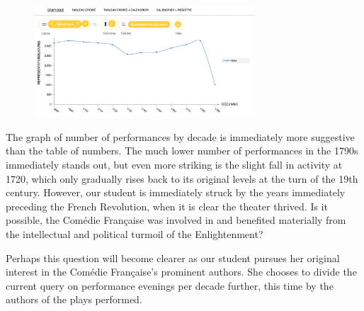 \documentclass[	DIV=calc,%
							paper=a4,%
							fontsize=11pt,%
							twocolumn]{scrartcl}	 					%
\begin{document}
\begin{figure}
  \centering
	\includegraphics[width=3.25in]{steps/performances_by_decade_graph.png}
	\caption{}
	\label{fig:performances_by_decade_graph}
\end{figure}

The graph of number of performances by decade is immediately more suggestive than the table of numbers.  The much lower number of performances in the 1790s immediately stands out, but even more striking is the slight fall in activity at 1720, which only gradually rises back to its original levels at the turn of the 19th century.  However, our student is immediately struck by the years immediately preceding the French Revolution, when it is clear the theater thrived.  Is it possible, the Comédie Française was involved in and benefited materially from the intellectual and political turmoil of the Enlightenment?

Perhaps this question will become clearer as our student pursues her original interest in the Comédie Française’s prominent authors.  She chooses to divide the current query on performance evenings per decade further, this time by the authors of the plays performed.
\end{document}
